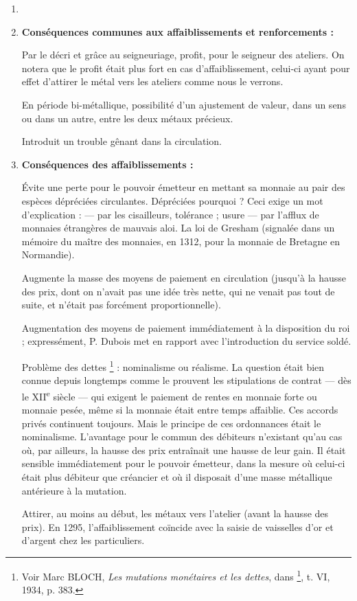 \documentclass[french,twoside]{book} %
\begin{document}
\begin{enumerate}[itemsep=\baselineskip,]
\item[] \hspace{-1.5em}{\bfseries Il faut distinguer :}
\item {\bfseries Conséquences communes aux affaiblissements et renforcements :}\par
Par le décri et grâce au seigneuriage, profit, pour le seigneur des ateliers. On notera que le profit était plus fort en cas d’affaiblissement, celui-ci ayant pour effet d’attirer le métal vers les ateliers comme nous le verrons.\par
En période bi-métallique, possibilité d’un ajustement de valeur, dans un sens ou dans un autre, entre les deux métaux précieux.\par
Introduit un trouble gênant dans la circulation.  
\label{p93}

\item {\bfseries Conséquences des affaiblissements :}\par
Évite une perte pour le pouvoir émetteur en mettant sa monnaie au pair des espèces dépréciées circulantes. Dépréciées pourquoi ? Ceci exige un mot d’explication : — par les cisailleurs, tolérance ; usure — par l’afflux de monnaies étrangères de mauvais aloi. La loi de Gresham (signalée dans un mémoire du maître des monnaies, en 1312, pour la monnaie de Bretagne en Normandie).\par
Augmente la masse des moyens de paiement en circulation (jusqu’à la hausse des prix, dont on n’avait pas une idée très nette, qui ne venait pas tout de suite, et n’était pas forcément proportionnelle).\par
Augmentation des moyens de paiement immédiatement à la disposition du roi ; expressément, P. Dubois met en rapport avec l’introduction du service soldé.\par
Problème des dettes \footnote{ Voir Marc BLOCH, {\itshape Les mutations monétaires et les dettes}, dans \href{http://gallica.bnf.fr/document?O=N010027}{}\footnote{\href{http://gallica.bnf.fr/document?O=N010027}{\url{http://gallica.bnf.fr/document?O=N010027}}}, t. VI, 1934, p. 383.} : nominalisme ou réalisme. La question était bien connue depuis longtemps comme le prouvent les stipulations de contrat — dès le XII\textsuperscript{e} siècle — qui exigent le paiement de rentes en monnaie forte ou monnaie pesée, même si la monnaie était entre temps affaiblie. Ces accords privés continuent toujours. Mais le principe de ces ordonnances était le nominalisme. L’avantage pour le commun des débiteurs n’existant qu’au cas où, par ailleurs, la hausse des prix entraînait une hausse de leur gain. Il était sensible immédiatement pour le pouvoir émetteur, dans la mesure où celui-ci était plus débiteur que créancier et où il disposait d’une masse métallique antérieure à la mutation.\par
Attirer, au moins au début, les métaux vers l’atelier (avant la hausse des prix). En 1295, l’affaiblissement coïncide avec la saisie de vaisselles d’or et d’argent chez les particuliers.


\end{enumerate}
\end{document}
